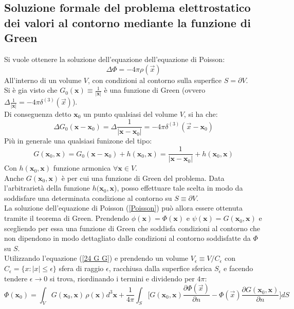 \documentclass[twoside]{article}
\renewcommand{\vec}[1]{\textbf{#1}}
\begin{document}
\subsection{Soluzione formale del problema elettrostatico dei valori al contorno mediante la funzione di Green}
Si vuole ottenere la soluzione dell'equazione dell'equazione di Poisson:
\begin{equation}
    \Delta \Phi=-4\pi\rho(\Vec{x})
\end{equation}
All'interno di un volume $V$, con condizioni al contorno sulla superfice $S=\partial V$.\\
Si è gia visto che $G_0(\vec{x})\equiv\frac{1}{|\vec{x}|}$ è una funzione di Green (ovvero $\Delta \frac{1}{|\vec{x}|}=-4\pi\delta^{(3)}(\Vec{x})$).\\
Di conseguenza detto $\vec{x}_0$ un punto qualsiasi del volume $V$, si ha che:
\begin{equation}
    \Delta G_0(\vec{x}-\vec{x}_0)=\Delta\frac{1}{|\vec{x}-\vec{x}_0|}=-4\pi\delta^{(3)}(\Vec{x}-\vec{x}_0)
\end{equation}
Più in generale una qualsiasi funizone del tipo:
\begin{equation}\label{24 G G}
    G(\vec{x}_0,\vec{x})=G_0(\vec{x}-\vec{x}_0)+h(\vec{x}_0,\vec{x})=\frac{1}{|\vec{x}-\vec{x}_0|}+h(\vec{x}_0,\vec{x})
\end{equation}
Con $h(\vec{x}_0,\vec{x})$ funzione armonica $\forall \vec{x}\in V$.\\
Anche $G(\vec{x}_0,\vec{x})$ è per cui una funzione di Green del problema. Data l'arbitrarietà della funzione $h(\vec{x}_0,\vec{x}$), posso effettuare tale scelta in modo da soddisfare una determinata condizione al contorno su $S\equiv\partial V$.\\
La soluzione dell'equazione di Poisson (\ref{Poisson}) può allora essere ottenuta tramite il teorema di Green. Prendendo $\phi(\vec{x})=\Phi(\vec{x})$ e $\psi(\vec{x})=G(\vec{x}_0,\vec{x})$ e scegliendo per essa una funzione di Green che soddisfa condizioni al contorno che non dipendono in modo dettagliato dalle condizioni al contorno soddisfatte da $\Phi$ su $S$.\\
Utilizzando l'equazione (\ref{24 G G}) e prendendo un volume $V_\epsilon\equiv V/C_\epsilon$ con $C_\epsilon=\{x:|x|\le\epsilon\}$ sfera di raggio $\epsilon$, racchiusa dalla superfice sferica  $S_\epsilon$ e facendo tendere $\epsilon\to 0$ si trova, riordinando i termini e dividendo per $4\pi$:
\begin{equation}\label{24 19}
    \Phi(\vec{x}_0)=\int_VG(\vec{x}_0,\vec{x})\frac{}{}\rho(\vec{x})d^3\vec{x}+\frac{1}{4\pi}\int_S\biggl[G(\vec{x}_0,\vec{x})\frac{\partial \Phi(\Vec{x})}{\partial n}-\Phi(\Vec{x})\frac{\partial G(\vec{x}_0,\vec{x})}{\partial n}\biggr]dS
\end{equation}
\end{document}
